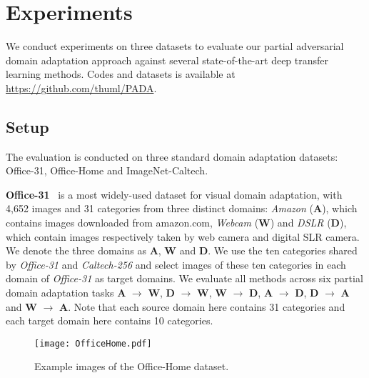 \documentclass[runningheads]{llncs}
\begin{document}
\section{Experiments}
We conduct experiments on three datasets to evaluate our partial adversarial domain adaptation approach against several state-of-the-art deep transfer learning methods. Codes and datasets is available at \url{https://github.com/thuml/PADA}.

\subsection{Setup}
The evaluation is conducted on three standard domain adaptation datasets: Office-31, Office-Home and ImageNet-Caltech.

\textbf{Office-31}~\cite{cite:ECCV10Office} is a most widely-used dataset for visual domain adaptation, with 4,652
images and 31 categories from three distinct domains: \textit{Amazon} (\textbf{A}), which contains images
downloaded from amazon.com, \textit{Webcam} (\textbf{W}) and \textit{DSLR} (\textbf{D}), which contain images respectively taken by web camera and digital SLR camera. We denote the three domains as \textbf{A}, \textbf{W} and \textbf{D}. We use the ten categories shared by \textit{Office-31} and \textit{Caltech-256} and select images of these ten categories in each domain of \textit{Office-31} as target domains. We evaluate all methods across
six partial domain adaptation tasks \textbf{A} $\rightarrow$ \textbf{W}, \textbf{D} $\rightarrow$ \textbf{W}, \textbf{W} $\rightarrow$ \textbf{D}, \textbf{A} $\rightarrow$ \textbf{D}, \textbf{D} $\rightarrow$ \textbf{A} and \textbf{W} $\rightarrow$ \textbf{A}. Note that each source domain here contains 31 categories and each target domain here contains 10 categories.

\begin{figure}[h]
  \centering
  \texttt{[image: OfficeHome.pdf]}
  \caption{Example images of the Office-Home dataset.}
  \label{fig:data}
\end{figure}
\end{document}
